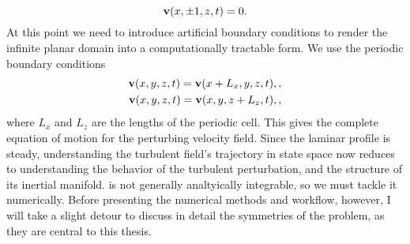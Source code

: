 \begin{equation}
\mathbf{v}(x,\pm 1,z,t) = 0.
\end{equation}
At this point we need to introduce artificial boundary conditions to  render the infinite planar domain into a computationally tractable form. We use the periodic boundary conditions 
\begin{align}
\mathbf{v}(x,y,z,t) = \mathbf{v}(x+L_x,y,z,t),\label{eq:periodicBCx},\\
\mathbf{v}(x,y,z,t) = \mathbf{v}(x,y,z+L_z,t),\label{eq:periodicBCz},
\end{align}
where $L_x$ and $L_z$ are the lengths of the periodic cell. This gives the complete equation of motion for the perturbing velocity field.  Since the laminar profile is steady, understanding the turbulent field's trajectory in state space now reduces to understanding the behavior of the turbulent perturbation, and the structure of its inertial manifold.  is not generally analtyically integrable, so we must tackle it numerically. Before presenting the numerical methods and workflow, however, I will take a slight detour to discuss in detail the symmetries of the \pCf problem, as they are central to this thesis. 

